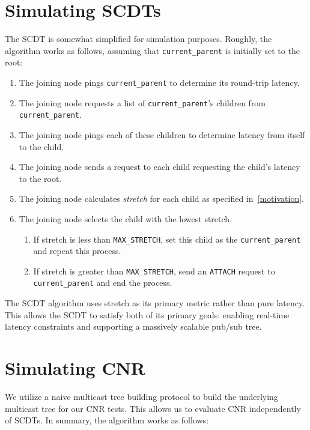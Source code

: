 \section{Simulating SCDTs}
\label{sim-scdt}
The SCDT is somewhat simplified for simulation purposes. Roughly, the algorithm works as follows, assuming that \texttt{current\_parent} is initially set to the root:

\begin{enumerate}
	\item The joining node pings \texttt{current\_parent} to determine its round-trip latency.
	\item The joining node requests a list of \texttt{current\_parent}'s children from \texttt{current\_parent}.
	\item The joining node pings each of these children to determine latency from itself to the child.
	\item The joining node sends a request to each child requesting the child's latency to the root.
	\item The joining node calculates \textit{stretch} for each child as specified in~\autoref{motivation}.
	\item The joining node selects the child with the lowest stretch. 
	\begin{enumerate}
	\item If stretch is less than \texttt{MAX\_STRETCH}, set this child as the \texttt{current\_parent} and repeat this process. 
	\item If stretch is greater than \texttt{MAX\_STRETCH}, send an \texttt{ATTACH} request to \texttt{current\_parent} and end the process.
	\end{enumerate}
\end{enumerate}

The SCDT algorithm uses stretch as its primary metric rather than pure latency. This allows the SCDT to satisfy both of its primary goals: enabling real-time latency constraints and supporting a massively scalable pub/sub tree.

\section{Simulating CNR}
\label{sim-cnr}
We utilize a naive multicast tree building protocol to build the underlying multicast tree for our CNR tests. This allows us to evaluate CNR independently of SCDTs. In summary, the algorithm works as follows:


